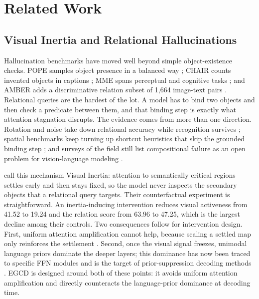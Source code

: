\documentclass[pdflatex,sn-basic,Numbered]{sn-jnl}
\theoremstyle{thmstyleone}
\theoremstyle{thmstyletwo}
\theoremstyle{thmstylethree}
\begin{document}
\section{Related Work}\label{sec:related}

\subsection{Visual Inertia and Relational Hallucinations}\label{subsec:visual-inertia}

Hallucination benchmarks have moved well beyond simple object-existence checks. POPE samples object presence in a balanced way \cite{li2023bevaluating}; CHAIR counts invented objects in captions \cite{rohrbach2018object}; MME spans perceptual and cognitive tasks \cite{fu2025mme}; and AMBER adds a discriminative relation subset of 1,664 image-text pairs \cite{wang2023amber}. Relational queries are the hardest of the lot. A model has to bind two objects and then check a predicate between them, and that binding step is exactly what attention stagnation disrupts. The evidence comes from more than one direction. Rotation and noise take down relational accuracy while recognition survives \cite{shin2026when}; spatial benchmarks keep turning up shortcut heuristics that skip the grounded binding step \cite{brown2025hallucination,chen2024spatialvlm}; and surveys of the field still list compositional failure as an open problem for vision-language modeling \cite{bordes2024towards}.

\cite{gong2026attention} call this mechanism Visual Inertia: attention to semantically critical regions settles early and then stays fixed, so the model never inspects the secondary objects that a relational query targets. Their counterfactual experiment is straightforward. An inertia-inducing intervention reduces visual activeness from 41.52 to 19.24 and the relation score from 63.96 to 47.25, which is the largest decline among their controls. Two consequences follow for intervention design. First, uniform attention amplification cannot help, because scaling a settled map only reinforces the settlement \cite{gong2026attention,chen2026mitigating}. Second, once the visual signal freezes, unimodal language priors dominate the deeper layers; this dominance has now been traced to specific FFN modules \cite{guo2026fade} and is the target of prior-suppression decoding methods \cite{ren2026nolan,min2025mitigating}. EGCD is designed around both of these points: it avoids uniform attention amplification and directly counteracts the language-prior dominance at decoding time.
\end{document}
